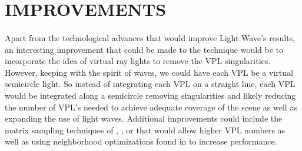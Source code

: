 \section{IMPROVEMENTS}
\paragraph{}
Apart from the technological advances that would improve Light Wave's results, an interesting improvement that could be made to the technique would be to incorporate the idea of virtual ray lights \cite{Novak2012} to remove the VPL singularities.  However, keeping with the spirit of waves, we could have each VPL be a virtual semicircle light.  So instead of integrating each VPL on a straight line, each VPL would be integrated along a semicircle removing singularities and likely reducing the number of VPL's needed to achieve adequate coverage of the scene as well as expanding the use of light waves.  Additional improvements could include the matrix sampling techniques of \cite{Havsan2007}, \cite{Ou2011}, or \cite{Walter2005a} that would allow higher VPL numbers as well as using neighborhood optimizations found in \cite{Dachsbacher2006} to increase performance.